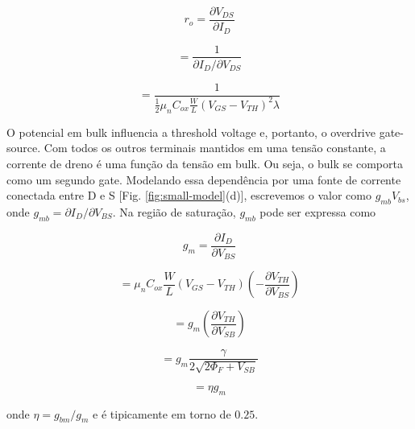 \documentclass[10pt, conference,a4paper]{IEEEtran}
\begin{document}
\begin{equation}
    r_o = \frac{\partial V_{DS}}{\partial I_D}
\end{equation}

\begin{equation}
    = \frac{1}{\partial I_D / \partial V_{DS}}
\end{equation}

\begin{equation}
    = \frac{1}{\frac{1}{2} \mu_n C_{ox} \frac{W}{L} (V_{GS} - V_{TH})^2 \lambda}
\end{equation}

O potencial em bulk influencia a threshold voltage e, portanto, o overdrive gate-source. Com todos os outros terminais mantidos em uma tensão constante, a corrente de dreno é uma função da tensão em bulk. Ou seja, o bulk se comporta como um segundo gate. Modelando essa dependência
por uma fonte de corrente conectada entre D e S [Fig. \ref{fig:small-model}(d)], escrevemos o valor como $g_{mb}V_{bs}$, onde
$g_{mb} = \partial I_D / \partial V_{BS}$. Na região de saturação, $g_{mb}$ pode ser expressa como

\begin{equation}
    g_m = \frac{\partial I_D}{\partial V_{BS}}
\end{equation}

\begin{equation}
    = \mu_n C_{ox} \frac{W}{L} (V_{GS} - V_{TH}) \left (- \frac{\partial V_{TH}}{\partial V_{BS}} \right)
\end{equation}

\begin{equation}
    = g_m \left (\frac{\partial V_{TH}}{\partial V_{SB}} \right)
\end{equation}

\begin{equation}
    = g_m \frac{\gamma}{2 \sqrt{2 \Phi_F + V_{SB}}} 
\end{equation}

\begin{equation}
    = \eta g_m 
\end{equation}

onde $\eta = g_{bm}/g_m$ e é tipicamente em torno de $0.25$.

\begin{comment}
\begin{figure}[h]
    \centering
    \texttt{[image: Figures/small\_signal.png]}
    \caption{MOS Small-Signal Model}
    \label{fig:small-signal}
\end{figure}

No slide fala que a lei quadrática falha pra descrever inversão fraca. Acho que nesse slide abaixo tá dizendo que a lei quadrática pode ser útil em transistores de canal longo porque os efeitos de canal curto são mais proeminentes.

Ler sobre efeito de canal curto. Porque o gráfico mostra que L tá influenciando em ID, mas no slide tá dizendo que L não influencia fracamente em ID. Ver se o gráfico que plotei também apresenta isso.
\end{comment}
\end{document}
